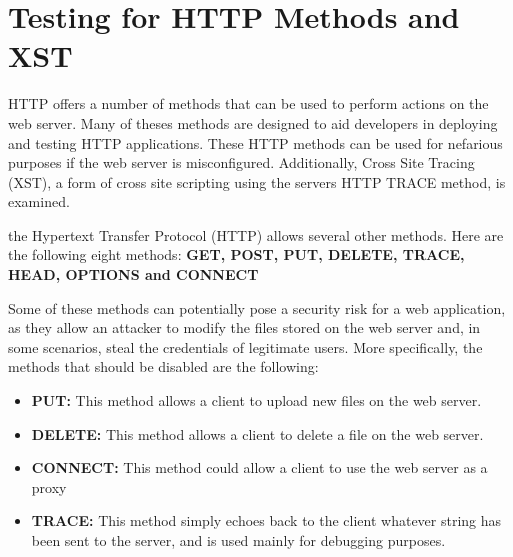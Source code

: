 \section{Testing for HTTP Methods and XST}
	HTTP offers a number of methods that can be used to perform actions on the web server. Many of 
	theses methods are designed to aid developers in deploying and testing HTTP applications. 
	These HTTP methods can be used for nefarious purposes if the web server is misconfigured. 
	Additionally, Cross Site Tracing (XST), a form of cross site scripting using the servers 
	HTTP TRACE method, is examined.

	the Hypertext Transfer Protocol (HTTP) allows several other methods. 
	Here are the following eight methods: {\bf GET, POST, PUT, DELETE, TRACE, HEAD, 
	OPTIONS and CONNECT}

	Some of these methods can potentially pose a security risk for a web application, as they allow 
	an attacker to modify the files stored on the web server and, in some scenarios, steal the 
	credentials of legitimate users. More specifically, the methods that should be disabled are 
	the following:
		\begin{itemize}
			\item {\bf PUT:} This method allows a client to upload new files on the web server. 
			\item {\bf DELETE:} This method allows a client to delete a file on the web server. 
			\item {\bf CONNECT:} This method could allow a client to use the web server as a proxy
			\item {\bf TRACE:} This method simply echoes back to the client whatever string has been sent 
			to the server, and is used mainly for debugging purposes.
		\end{itemize}
		